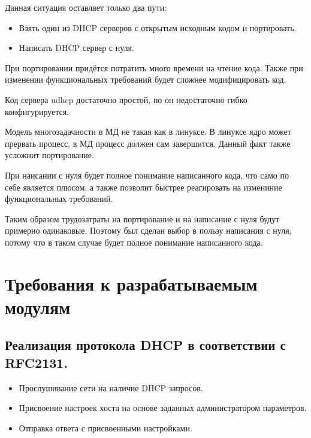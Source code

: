 \documentclass[14pt,a4paper]{extarticle}
\begin{document}
Данная ситуация оставляет только два пути:

\begin{itemize}
    \item Взять один из DHCP серверов с открытым исходным кодом и портировать.
    \item Написать DHCP сервер с нуля.
\end{itemize}

При портировании придётся потратить много времени на чтение кода.
Также при изменении функциональных требований будет сложнее модифицировать код.

Код сервера udhcp достаточно простой, но он недостаточно гибко конфигурируется.

Модель многозадачности в МД не такая как в линуксе.
В линуксе ядро может прервать процесс, в МД процесс должен сам завершится.
Данный факт также усложнит портирование.

При наисании с нуля будет полное понимание написанного кода, что само по себе является плюсом, а также позволит быстрее реагировать на измениние функциональных требований.

Таким образом трудозатраты на портирование и на написание с нуля будут примерно одинаковые.
Поэтому был сделан выбор в пользу написания с нуля, потому что в таком случае будет полное понимание написанного кода.

\section{Требования к разрабатываемым модулям}

\subsection{Реализация протокола DHCP в соответствии с RFC2131.}
\begin{itemize}
    \item Прослушивание сети на наличие DHCP запросов.
    \item Присвоение настроек хоста на основе заданных администратором параметров.
    \item Отправка ответа с присвоенными настройками.
\end{itemize}
\end{document}
